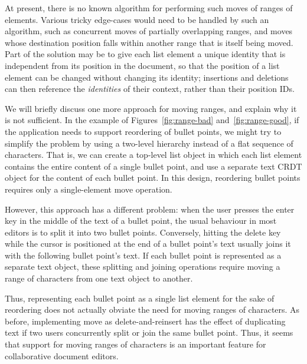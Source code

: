 \documentclass[sigplan,10pt]{acmart}
\begin{document}
At present, there is no known algorithm for performing such moves of ranges of elements.
Various tricky edge-cases would need to be handled by such an algorithm, such as concurrent moves of partially overlapping ranges, and moves whose destination position falls within another range that is itself being moved.
Part of the solution may be to give each list element a unique identity that is independent from its position in the document, so that the position of a list element can be changed without changing its identity; insertions and deletions can then reference the \emph{identities} of their context, rather than their position IDs.

We will briefly discuss one more approach for moving ranges, and explain why it is not sufficient.
In the example of Figures~\ref{fig:range-bad} and~\ref{fig:range-good}, if the application needs to support reordering of bullet points, we might try to simplify the problem by using a two-level hierarchy instead of a flat sequence of characters.
That is, we can create a top-level list object in which each list element contains the entire content of a single bullet point, and use a separate text CRDT object for the content of each bullet point.
In this design, reordering bullet points requires only a single-element move operation.

However, this approach has a different problem: when the user presses the enter key in the middle of the text of a bullet point, the usual behaviour in most editors is to split it into two bullet points.
Conversely, hitting the delete key while the cursor is positioned at the end of a bullet point's text usually joins it with the following bullet point's text.
If each bullet point is represented as a separate text object, these splitting and joining operations require moving a range of characters from one text object to another.

Thus, representing each bullet point as a single list element for the sake of reordering does not actually obviate the need for moving ranges of characters.
As before, implementing move as delete-and-reinsert has the effect of duplicating text if two users concurrently split or join the same bullet point.
Thus, it seems that support for moving ranges of characters is an important feature for collaborative document editors.


\end{document}
